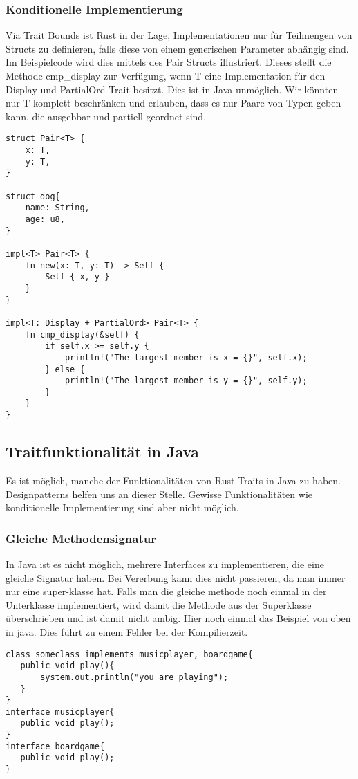 \documentclass[a4paper, 1ppt]{article}
\begin{document}
\subsubsection{Konditionelle Implementierung}
Via Trait Bounds ist Rust in der Lage, Implementationen nur für Teilmengen von Structs zu definieren, falls diese von einem generischen Parameter abhängig sind.
Im Beispielcode wird dies mittels des Pair Structs illustriert. Dieses stellt die Methode cmp\_display zur Verfügung, wenn T eine Implementation für den Display und PartialOrd Trait besitzt.
Dies ist in Java unmöglich. Wir könnten nur T komplett beschränken und erlauben, dass es nur Paare von Typen geben kann, die ausgebbar und partiell geordnet sind.
\begin{verbatim}
struct Pair<T> {
    x: T,
    y: T,
}

struct dog{
    name: String,
    age: u8,
}

impl<T> Pair<T> {
    fn new(x: T, y: T) -> Self {
        Self { x, y }
    }
}

impl<T: Display + PartialOrd> Pair<T> {
    fn cmp_display(&self) {
        if self.x >= self.y {
            println!("The largest member is x = {}", self.x);
        } else {
            println!("The largest member is y = {}", self.y);
        }
    }
}
\end{verbatim}
\subsection{Traitfunktionalität in Java}
Es ist möglich, manche der Funktionalitäten von Rust Traits in Java zu haben.
Designpatterns\cite{websitedesignpatterns} helfen uns an dieser Stelle. Gewisse Funktionalitäten wie konditionelle Implementierung sind aber nicht möglich.
\subsubsection{Gleiche Methodensignatur}
In Java ist es nicht möglich, mehrere Interfaces zu implementieren, die eine gleiche Signatur haben.
Bei Vererbung kann dies nicht passieren, da man immer nur eine super-klasse hat. Falls man die gleiche methode noch einmal in der Unterklasse implementiert, wird damit die Methode aus der Superklasse überschrieben und ist damit nicht ambig.
Hier noch einmal das Beispiel von oben in java. Dies führt zu einem Fehler bei der Kompilierzeit.
\begin{verbatim}
class someclass implements musicplayer, boardgame{
   public void play(){
       system.out.println("you are playing");
   }
}
interface musicplayer{
   public void play();
}
interface boardgame{
   public void play();
}
\end{verbatim}
\end{document}
